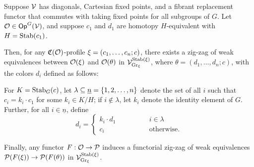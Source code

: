 \documentclass[a4paper,10pt
,draft
]{article}%
\renewcommand{\1}{\ensuremath{\mathbb{id}}}
\begin{document}
\begin{lemma}
      \label{CAV_4.14_PROP2}
      Suppose $\mathcal V$ has diagonals,
      Cartesian fixed points,
      and a fibrant replacement functor that commutes with taking fixed points for all subgroups of $G$.
      Let $\mathcal{O} \in \mathsf{Op}^G(\mathcal V)$, and suppose
      $c_1$ and $d_1$ are homotopy $H$-equivalent with $H = \mathrm{Stab}(c_1)$.

      Then, for any $\mathfrak C(\mathcal{O})$-profile $\xi = (c_1,\dots,c_n;c)$,
      there exists a zig-zag of weak equivalences between
      $\mathcal{O}(\xi)$ and $\mathcal{O}(\theta)$
      in $\mathcal V^{\mathrm{Stab}(\xi)}_{\mathrm{Gr}_\xi}$,
      where
      $\theta = (d_1,\ldots, d_n; c)$, with the colors $d_i$ defined as follows:
            
      For $K = \mathrm{Stab}_G(c)$, let $\lambda \subseteq \underline{n} = \left\{1,2,\ldots, n\right\}$ denote
      the set of all $i$ such that $c_i = k_i \cdot c_1$ for some $k_i\in K/H$;
      if $i \notin \lambda$, let $k_i$ denote the identity element of $G$.
      Further, for all $i \in \underline{n}$, define
      \begin{equation}
            \label{DCOLORS_EQ}
            d_i =
            \begin{cases}
                  k_i \cdot d_1 \qquad \qquad & i \in \lambda
                  \\
                  c_i & \mbox{otherwise.}
            \end{cases}
      \end{equation}
      
      Finally, any functor $F: \mathcal{O} \to \mathcal{P}$ induces a functorial zig-zag of weak equivalences
      $\mathcal{P}(F(\xi)) \to \mathcal{P}(F(\theta))$ in $\mathcal V^{\mathrm{Stab}(\xi)}_{\mathrm{Gr}_\xi}$.
\end{lemma}
\end{document}
